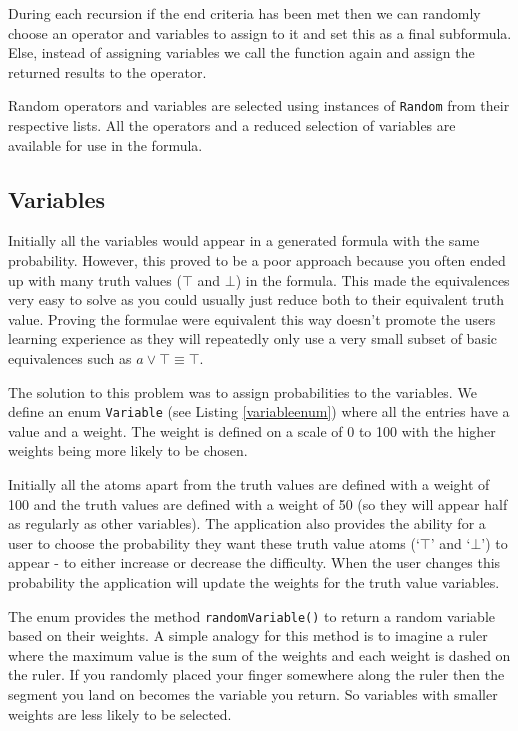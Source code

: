 \documentclass{report}
\begin{document}
During each recursion if the end criteria has been met then we can randomly choose an operator and variables to assign to it and set this as a final subformula. Else, instead of assigning variables we call the function again and assign the returned results to the operator.

Random operators and variables are selected using instances of {\tt Random} from their respective lists. All the operators and a reduced selection of variables are available for use in the formula.

\subsection{Variables}
\label{sub:variables}

Initially all the variables would appear in a generated formula with the same probability. However, this proved to be a poor approach because you often ended up with many truth values ($\top$ and $\bot$) in the formula. This made the equivalences very easy to solve as you could usually just reduce both to their equivalent truth value. Proving the formulae were equivalent this way doesn't promote the users learning experience as they will repeatedly only use a very small subset of basic equivalences such as $a\lor\top \equiv \top$.

The solution to this problem was to assign probabilities to the variables. We define an enum {\tt Variable} (see Listing \ref{variableenum}) where all the entries have a value and a weight. The weight is defined on a scale of 0 to 100 with the higher weights being more likely to be chosen.

Initially all the atoms apart from the truth values are defined with a weight of 100 and the truth values are defined with a weight of 50 (so they will appear half as regularly as other variables). The application also provides the ability for a user to choose the probability they want these truth value atoms (`$\top$' and `$\bot$') to appear - to either increase or decrease the difficulty. When the user changes this probability the application will update the weights for the truth value variables.

The enum provides the method {\tt randomVariable()} to return a random variable based on their weights. A simple analogy for this method is to imagine a ruler where the maximum value is the sum of the weights and each weight is dashed on the ruler. If you randomly placed your finger somewhere along the ruler then the segment you land on becomes the variable you return. So variables with smaller weights are less likely to be selected.
\end{document}
